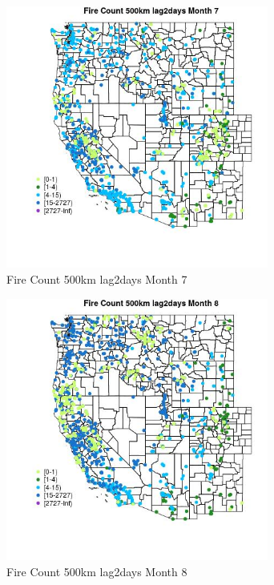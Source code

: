 \begin{figure} 
\centering  
\includegraphics[width=0.77\textwidth]{Code_Outputs/Report_ML_input_PM25_Step4_part_f_de_duplicated_aveswNAs_MapObsMo7Fire_Count_500km_lag2days.jpg} 
\caption{\label{fig:Report_ML_input_PM25_Step4_part_f_de_duplicated_aveswNAsMapObsMo7Fire_Count_500km_lag2days}Fire Count 500km lag2days Month 7} 
\end{figure} 
 

\begin{figure} 
\centering  
\includegraphics[width=0.77\textwidth]{Code_Outputs/Report_ML_input_PM25_Step4_part_f_de_duplicated_aveswNAs_MapObsMo8Fire_Count_500km_lag2days.jpg} 
\caption{\label{fig:Report_ML_input_PM25_Step4_part_f_de_duplicated_aveswNAsMapObsMo8Fire_Count_500km_lag2days}Fire Count 500km lag2days Month 8} 
\end{figure} 
 

